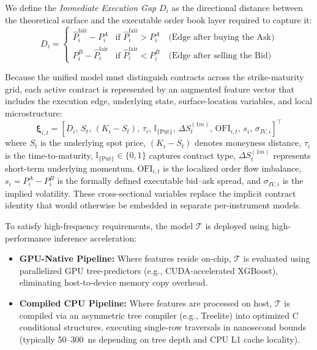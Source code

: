 \documentclass[11pt, a4paper]{article}
\begin{document}
We define the \textit{Immediate Execution Gap} $D_i$ as the directional distance between the theoretical surface and the executable order book layer required to capture it:
\begin{equation}
D_i = \begin{cases}
\widehat{P}^{\mathrm{fair}}_i - P^{A}_i & \text{if } \widehat{P}^{\mathrm{fair}}_i > P^{A}_i \quad \text{(Edge after buying the Ask)}  \\
P^{B}_i - \widehat{P}^{\mathrm{fair}}_i & \text{if } \widehat{P}^{\mathrm{fair}}_i < P^{B}_i \quad \text{(Edge after selling the Bid)}
\end{cases}
\end{equation}

Because the unified model must distinguish contracts across the strike-maturity grid, each active contract is represented by an augmented feature vector that includes the execution edge, underlying state, surface-location variables, and local microstructure:
\begin{equation}
\boldsymbol{\xi}_{i,t} = \left[ D_i, \, S_t, \, (K_i - S_t), \, \tau_i, \, \mathbb{I}_{\{\text{Put}\}}, \, \Delta S_t^{(1m)}, \, \mathrm{OFI}_{i,t}, \, s_i, \, \sigma_{IV,i} \right]^\top
\end{equation}
where $S_t$ is the underlying spot price, $(K_i-S_t)$ denotes moneyness distance, $\tau_i$ is the time-to-maturity, $\mathbb{I}_{\{\text{Put}\}} \in \{0,1\}$ captures contract type, $\Delta S_t^{(1m)}$ represents short-term underlying momentum, $\mathrm{OFI}_{i,t}$ is the localized order flow imbalance, $s_i = P^A_i - P^B_i$ is the formally defined executable bid--ask spread, and $\sigma_{IV,i}$ is the implied volatility. These cross-sectional variables replace the implicit contract identity that would otherwise be embedded in separate per-instrument models.

To satisfy high-frequency requirements, the model $\mathcal{T}$ is deployed using high-performance inference acceleration:
\begin{itemize}
    \item \textbf{GPU-Native Pipeline:} Where features reside on-chip, $\mathcal{T}$ is evaluated using parallelized GPU tree-predictors (e.g., CUDA-accelerated XGBoost), eliminating host-to-device memory copy overhead.
    \item \textbf{Compiled CPU Pipeline:} Where features are processed on host, $\mathcal{T}$ is compiled via an asymmetric tree compiler (e.g., Treelite) into optimized C conditional structures, executing single-row traversals in nanosecond bounds (typically 50--300~ns depending on tree depth and CPU L1 cache locality).
\end{itemize}
\end{document}
